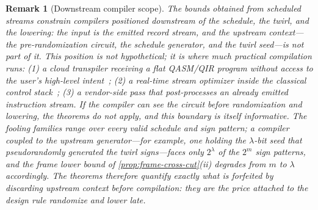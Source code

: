 \documentclass[a4paper,twocolumn,10pt,unpublished]{quantumarticle}
\newtheorem{remark}{Remark}
\begin{document}
\begin{remark}[Downstream compiler scope]
\label{rem:downstream-scope}
The bounds obtained from scheduled streams constrain compilers
positioned \emph{downstream} of the schedule, the twirl, and the
lowering: the input is the emitted record stream, and the upstream
context---the pre-randomization circuit, the schedule generator, and
the twirl seed---is not part of it.  This position is not hypothetical;
it is where much practical compilation runs: (1) a cloud transpiler
receiving a flat QASM/QIR program without access to the user's
high-level intent~\cite{javadi2024qiskit}; (2) a real-time stream
optimizer inside the classical control
stack~\cite{riesebos2017pauli}; (3) a vendor-side pass that
post-processes an already emitted instruction stream.  If the compiler
can see the circuit before randomization and lowering, the theorems do
not apply, and this boundary is itself informative.  The fooling
families range over every valid schedule and sign pattern; a compiler
coupled to the upstream generator---for example, one holding the
$\lambda$-bit seed that pseudorandomly generated the twirl
signs---faces only $2^\lambda$ of the $2^m$ sign patterns, and the
frame lower bound of \cref{prop:frame-cross-cut}(ii) degrades from $m$
to $\lambda$ accordingly.  The theorems therefore quantify exactly what
is forfeited by discarding upstream context before compilation: they
are the price attached to the design rule \emph{randomize and lower
late}.
\end{remark}
\end{document}
